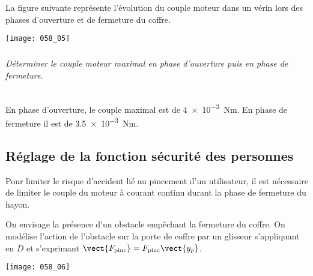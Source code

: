 \ifprof
\else
La figure suivante représente l’évolution du couple moteur dans un vérin lors des phases d’ouverture et de fermeture
du coffre.

\begin{center}
\texttt{[image: 058\_05]}
\end{center}
\fi

\subparagraph{}
\textit{Déterminer le couple moteur maximal en phase d’ouverture puis en phase de fermeture.}
\ifprof
\begin{corrige}~\\
En phase d'ouverture, le couple maximal est de \SI{4e-3}{Nm}. En phase de fermeture il est de \SI{3,5e-3}{Nm}.
\end{corrige}
\else
\fi



\subsection*{Réglage de la fonction sécurité des personnes}

\ifprof
\else
Pour limiter le risque d’accident lié au pincement d’un utilisateur, il est nécessaire de limiter le couple du moteur
à courant continu durant la phase de fermeture du hayon. %



On envisage la présence d’un obstacle empêchant la fermeture du coffre. On modélise l’action de l’obstacle sur la porte de coffre par un glisseur s’appliquant en $D$ et s’exprimant $\vect{F_{\text{pinc}}} = F_{\text{pinc}}\vect{y_p}$.

\begin{center}
\texttt{[image: 058\_06]}
\end{center}



%

